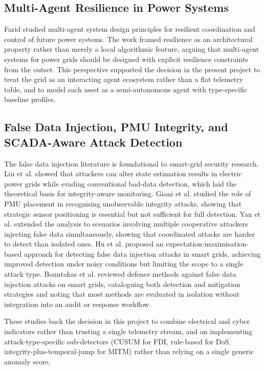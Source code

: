 \subsection{Multi-Agent Resilience in Power Systems}

Farid \cite{farid2014multi} studied multi-agent system design principles for resilient coordination and control of future power systems. The work framed resilience as an architectural property rather than merely a local algorithmic feature, arguing that multi-agent systems for power grids should be designed with explicit resilience constraints from the outset. This perspective supported the decision in the present project to treat the grid as an interacting agent ecosystem rather than a flat telemetry table, and to model each asset as a semi-autonomous agent with type-specific baseline profiles.

\subsection{False Data Injection, PMU Integrity, and SCADA-Aware Attack Detection}

The false data injection literature is foundational to smart-grid security research. Liu et al. \cite{liu2009false} showed that attackers can alter state estimation results in electric power grids while evading conventional bad-data detection, which laid the theoretical basis for integrity-aware monitoring. Giani et al. \cite{giani2014phasor} studied the role of PMU placement in recognising unobservable integrity attacks, showing that strategic sensor positioning is essential but not sufficient for full detection. Yan et al. \cite{yan2020false} extended the analysis to scenarios involving multiple cooperative attackers injecting false data simultaneously, showing that coordinated attacks are harder to detect than isolated ones. Hu et al. \cite{hu2023detection} proposed an expectation-maximisation-based approach for detecting false data injection attacks in smart grids, achieving improved detection under noisy conditions but limiting the scope to a single attack type. Bountakas et al. \cite{bountakas2023defense} reviewed defence methods against false data injection attacks on smart grids, cataloguing both detection and mitigation strategies and noting that most methods are evaluated in isolation without integration into an audit or response workflow.

These studies back the decision in this project to combine electrical and cyber indicators rather than trusting a single telemetry stream, and on implementing attack-type-specific sub-detectors (CUSUM for FDI, rule-based for DoS, integrity-plus-temporal-jump for MITM) rather than relying on a single generic anomaly score.


